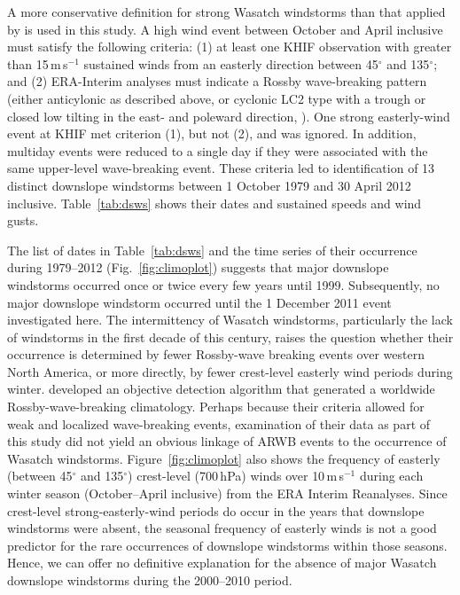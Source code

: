 \documentclass[pdftex,12pt]{article}
\def\mps{m\,s$^{-1}$}
\def\degarc{$^{\circ}$} %
\begin{document}
A more conservative definition for strong Wasatch windstorms than that applied by \citet{Holland2002} is used in this study. A high wind event between October and April inclusive must satisfy the following criteria: (1) at least one KHIF observation with greater than 15\,\mps{} sustained winds from an easterly direction between 45\degarc{} and 135\degarc{}; and (2) ERA-Interim analyses must indicate a Rossby wave-breaking pattern (either anticylonic as described above, or cyclonic LC2 type with a trough or closed low tilting in the east- and poleward direction, \citealt{Thorncroft1993}). One strong easterly-wind event at KHIF met criterion (1), but not (2), and was ignored. In addition, multiday events were reduced to a single day if they were associated with the same upper-level wave-breaking event. These criteria led to identification of 13 distinct downslope windstorms between 1 October 1979 and 30 April 2012 inclusive. Table~\ref{tab:dsws} shows their dates and sustained speeds and wind gusts.

The list of dates in Table~\ref{tab:dsws} and the time series of their occurrence during 1979--2012 (Fig.~\ref{fig:climoplot}) suggests that major downslope windstorms occurred once or twice every few years until 1999. Subsequently, no major downslope windstorm occurred until the 1 December 2011 event investigated here. The intermittency of Wasatch windstorms, particularly the lack of windstorms in the first decade of this century, raises the question whether their occurrence is determined by fewer Rossby-wave breaking events over western North America, or more directly, by fewer crest-level easterly wind periods during winter. \citet{Strong2008} developed an objective detection algorithm that generated a worldwide Rossby-wave-breaking climatology. Perhaps because their criteria allowed for weak and localized wave-breaking events, examination of their data as part of this study did not yield an obvious linkage of ARWB events to the occurrence of Wasatch windstorms. Figure~\ref{fig:climoplot} also shows the frequency of easterly (between 45\degarc{} and 135\degarc{}) crest-level (700\,hPa) winds over 10\,\mps{} during each winter season (October--April inclusive) from the ERA Interim Reanalyses. Since crest-level strong-easterly-wind periods do occur in the years that downslope windstorms were absent, the seasonal frequency of easterly winds is not a good predictor for the rare occurrences of downslope windstorms within those seasons. Hence, we can offer no definitive explanation for the absence of major Wasatch downslope windstorms during the 2000--2010 period.
\end{document}
